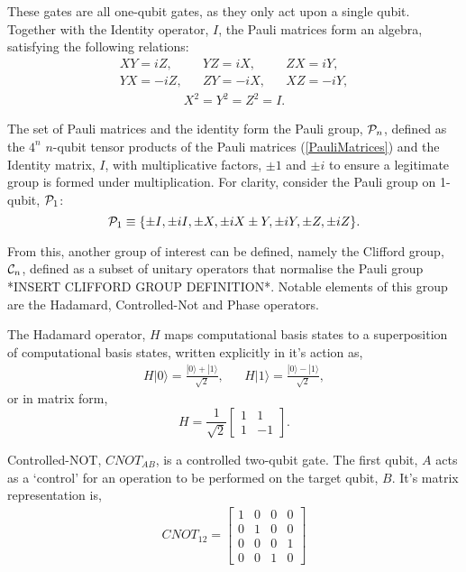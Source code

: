 These gates are all one-qubit gates, as they only act upon a single qubit.
Together with the Identity operator, $I$, the Pauli matrices form an algebra,
satisfying the following relations:
\begin{align}
    XY = iZ,  &  & YZ = iX,  &  & ZX = iY,  \\
    YX = -iZ, &  & ZY = -iX, &  & XZ = -iY,
\end{align}
\begin{align}
    X^2 = Y^2 = Z^2 = I.
\end{align}


The set of Pauli matrices and the identity form
the Pauli group, ${\cal P}_n$, defined as the $4^n$ $n$-qubit tensor products of the Pauli matrices (\ref{PauliMatrices}) and the
Identity matrix, $I$, with multiplicative factors, $\pm 1$ and $\pm i$ to ensure a legitimate group is formed under multiplication.
For clarity, consider the Pauli group on 1-qubit, ${\cal P}_1$:
\begin{equation}\label{PauliGroup}
    {\cal P}_1 \equiv \{ \pm I, \pm iI, \pm X, \pm iX \pm Y, \pm iY, \pm Z, \pm iZ\}.
\end{equation}



From this, another group of interest can be defined, namely the Clifford group, ${\cal C}_n$, defined as a
subset of unitary operators that normalise the Pauli group *INSERT CLIFFORD GROUP DEFINITION*.
Notable elements of this group are the Hadamard, Controlled-Not and Phase operators.

The Hadamard operator, $H$ maps computational basis states to a superposition of computational basis states, written explicitly 
in it's action as, 
\begin{align*}
    H|0\rangle = \frac{|0\rangle + |1\rangle}{\sqrt{2}}, && H|1\rangle = \frac{|0\rangle - |1\rangle}{\sqrt{2}},
\end{align*}
or in matrix form, 
\begin{equation}
    H = \frac{1}{\sqrt{2}} \begin{bmatrix}
        1 & 1\\
        1 & -1
    \end{bmatrix}.
\end{equation}

Controlled-NOT, $CNOT_{AB}$, is a controlled two-qubit gate. The first qubit, $A$ acts as a `control' for an operation to be 
performed on the target qubit, $B$. It's matrix representation is, 
\begin{align*}
    CNOT_{12} = \begin{bmatrix}
        1 & 0 & 0 & 0 \\
        0 & 1 & 0 & 0 \\
        0 & 0 & 0 & 1 \\
        0 & 0 & 1 & 0
        \end{bmatrix}
\end{align*}

